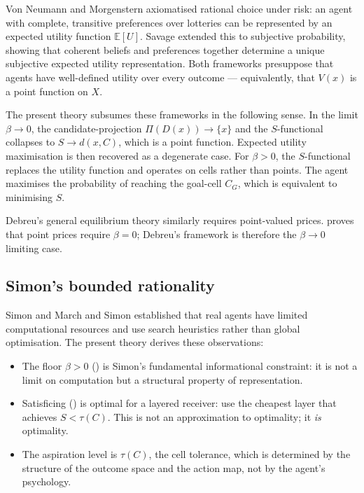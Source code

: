\documentclass[twocolumn,11pt,a4paper]{article}
\begin{document}
Von Neumann and Morgenstern \cite{vnm1944} axiomatised rational choice
under risk: an agent with complete, transitive preferences over lotteries
can be represented by an expected utility function $\mathbb{E}[U]$.
Savage \cite{savage1954} extended this to subjective probability, showing
that coherent beliefs and preferences together determine a unique
subjective expected utility representation.  Both frameworks presuppose
that agents have well-defined utility over every outcome — equivalently,
that $V(x)$ is a point function on $X$.

The present theory subsumes these frameworks in the following sense.  In
the limit $\beta\to 0$, the candidate-projection $\Pi(D(x))\to\{x\}$ and
the $S$-functional collapses to $S\to d(x,C)$, which is a point function.
Expected utility maximisation is then recovered as a degenerate case.  For
$\beta>0$, the $S$-functional replaces the utility function and operates
on cells rather than points.  The agent maximises the probability of
reaching the goal-cell $C_G$, which is equivalent to minimising $S$.

Debreu's general equilibrium theory \cite{debreu1959,arrowdebreu1954}
similarly requires point-valued prices.   proves
that point prices require $\beta=0$; Debreu's framework is therefore the
$\beta\to 0$ limiting case.

\subsection{Simon's bounded rationality}
\label{sec:lit:simon}

Simon \cite{simon1955,simon1956,simon1957} and March and Simon
\cite{march1958} established that real agents have limited computational
resources and use search heuristics rather than global optimisation.  The
present theory derives these observations:

\begin{itemize}[leftmargin=*]
  \item The floor $\beta>0$ () is Simon's fundamental
    informational constraint: it is not a limit on computation but a
    structural property of representation.
  \item Satisficing () is optimal for a
    layered receiver: use the cheapest layer that achieves $S<\tau(C)$.
    This is not an approximation to optimality; it \emph{is} optimality.
  \item The aspiration level is $\tau(C)$, the cell tolerance, which is
    determined by the structure of the outcome space and the action map,
    not by the agent's psychology.
\end{itemize}
\end{document}
